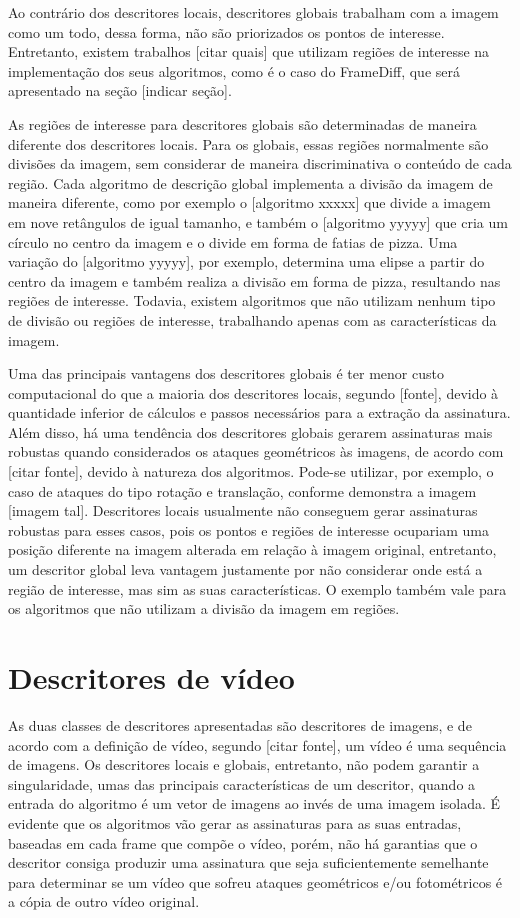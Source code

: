 Ao contrário dos descritores locais, descritores globais trabalham com a imagem como um todo, dessa forma, não são priorizados os pontos de interesse. Entretanto, existem trabalhos [citar quais] que utilizam regiões de interesse na implementação dos seus algoritmos, como é o caso do FrameDiff, que será apresentado na seção [indicar seção]. 

As regiões de interesse para descritores globais são determinadas de maneira diferente dos descritores locais. Para os globais, essas regiões normalmente são divisões da imagem, sem considerar de maneira discriminativa o conteúdo de cada região. Cada algoritmo de descrição global implementa a divisão da imagem de maneira diferente, como por exemplo o [algoritmo xxxxx] que divide a imagem em nove retângulos de igual tamanho, e também o [algoritmo yyyyy] que cria um círculo no centro da imagem e o divide em forma de fatias de pizza. Uma variação do [algoritmo yyyyy], por exemplo, determina uma elipse a partir do centro da imagem e também realiza a divisão em forma de pizza, resultando nas regiões de interesse. Todavia, existem algoritmos que não utilizam nenhum tipo de divisão ou regiões de interesse, trabalhando apenas com as características da imagem.

Uma das principais vantagens dos descritores globais é ter menor custo computacional do que a maioria dos descritores locais, segundo [fonte], devido à quantidade inferior de cálculos e passos necessários para a extração da assinatura. Além disso, há uma tendência dos descritores globais gerarem assinaturas mais robustas quando considerados os ataques geométricos às imagens, de acordo com [citar fonte], devido à natureza dos algoritmos. Pode-se utilizar, por exemplo, o caso de ataques do tipo rotação e translação, conforme demonstra a imagem [imagem tal]. Descritores locais usualmente não conseguem gerar assinaturas robustas para esses casos, pois os pontos e regiões de interesse ocupariam uma posição diferente na imagem alterada em relação à imagem original, entretanto, um descritor global leva vantagem justamente por não considerar onde está a região de interesse, mas sim as suas características. O exemplo também vale para os algoritmos que não utilizam a divisão da imagem em regiões.

\section{Descritores de vídeo}
\label{descritores de vídeo}

As duas classes de descritores apresentadas são descritores de imagens, e de acordo com a definição de vídeo, segundo [citar fonte], um vídeo é uma sequência de imagens. Os descritores locais e globais, entretanto, não podem garantir a singularidade, umas das principais características de um descritor,  quando a entrada do algoritmo é um vetor de imagens ao invés de uma imagem isolada. É evidente que os algoritmos vão gerar as assinaturas para as suas entradas, baseadas em cada frame que compõe o vídeo, porém, não há garantias que o descritor consiga produzir uma assinatura que seja suficientemente semelhante para determinar se um vídeo que sofreu ataques geométricos e/ou fotométricos é a cópia de outro vídeo original.

